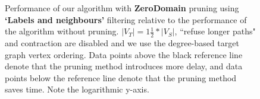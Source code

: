 \begin{figure}
\begin{subfigure} {0.5\linewidth}

\end{subfigure}

\caption{Performance of our algorithm with \textbf{ZeroDomain} pruning using \textbf{`Labels and neighbours'} filtering relative to the performance of the algorithm without pruning. $|V_T|=1\frac{1}{2}*|V_S|$, ``refuse longer paths" and contraction are disabled and we use the degree-based target graph vertex ordering. Data points above the black reference line denote that the pruning method introduces more delay, and data points below the reference line denote that the pruning method saves time. Note the logarithmic y-axis.}	
\label{fig:zerodomainlabelsneighbours}
\end{figure}
